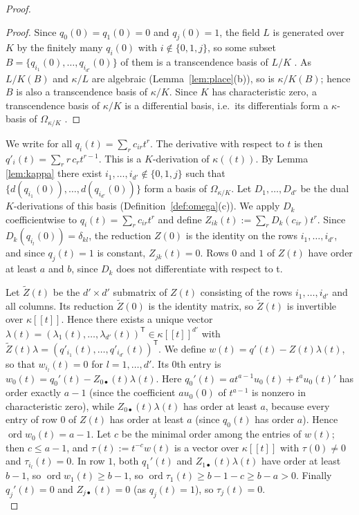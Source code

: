 \documentclass[pdflatex,sn-mathphys-num]{sn-jnl}
\numberwithin{equation}{section}
\theoremstyle{thmstyleone}
\theoremstyle{thmstyletwo}
\begin{document}
\begin{proof}
\begin{proof}
Since $q_0(0)=q_1(0)=0$ and $q_j(0)=1$, the field $L$ is generated over $K$ by
the finitely many $q_i(0)$ with $i\notin\{0,1,j\}$, so some subset
$B=\{q_{i_1}(0),\dots,q_{i_{d'}}(0)\}$ of them is a transcendence basis of $L/K$
\cite[Thm. VIII.1.1]{lang}. As $L/K(B)$ and $\kappa/L$ are algebraic
(Lemma~\ref{lem:place}(b)), so is $\kappa/K(B)$; hence $B$ is also a
transcendence basis of $\kappa/K$. Since $K$ has characteristic zero, a
transcendence basis of $\kappa/K$ is a differential basis, i.e.\ its
differentials form a $\kappa$-basis of $\Omega_{\kappa/K}$
\cite[Thm.~26.5]{matsumura}.
\end{proof}


We write for all $q_i(t) = \sum_rc_{ir}t^r$. The derivative with respect to $t$ is then $q'_i(t) = \sum_rr\,c_rt^{r-1}$. This is a $K$-derivation of $\kappa((t))$. By Lemma \ref{lem:kappa} there exist $i_1,\dots,i_{d'}\notin\{0,1,j\}$ such that $\{d(q_{i_1}(0)),\dots,d(q_{i_{d'}}(0))\}$ form a basis of $\Omega_{\kappa/K}$. Let $D_1,\dots,D_{d'}$ be the dual $K$-derivations of this basis (Definition~\ref{def:omega}(c)). 
We apply $D_k$ coefficientwise to $q_i(t)=\sum_rc_{ir}t^r$ and define $Z_{ik}(t):=\sum_rD_k(c_{ir})t^r$. Since $D_k(q_{i_l}(0))=\delta_{kl}$, the reduction $Z(0)$ is the identity on the rows $i_1,\dots,i_{d'}$, and since $q_j(t) = 1$ is constant, $Z_{jk}(t)=0$. Rows $0$ and $1$ of $Z(t)$ have order at least $a$ and $b$, since $D_k$ does not differentiate with respect to t. 

Let $\tilde Z(t)$ be the ${d'}\times {d'}$ submatrix of $Z(t)$ consisting of the rows
$i_1,\dots,i_{d'}$ and all columns. Its reduction $\tilde Z(0)$ is the identity
matrix, so $\tilde Z(t)$ is invertible over $\kappa[[t]]$. Hence there exists a unique vector
$\lambda(t)=(\lambda_1(t),\dots,\lambda_{d'}(t))^{\mathsf T}\in\kappa[[t]]^{d'}$ with
$\tilde Z(t)\lambda=(q'_{i_1}(t),\dots,q'_{i_{d'}}(t))^{\mathsf T}$. We define $w(t)=q'(t)-Z(t)\lambda(t)$, so
that $w_{i_l}(t)=0$ for $l=1,\dots,{d'}$.
Its $0$th entry is $w_0(t)=q_0'(t)-Z_{0\bullet}(t)\lambda(t)$. Here
$q_0'(t)=at^{a-1}u_0(t)+t^au_0(t)'$ has order exactly $a-1$ (since the coefficient
$au_0(0)$ of $t^{a-1}$ is nonzero in characteristic zero),
while $Z_{0\bullet}(t)\lambda(t)$ has order at least $a$, because every entry of
row $0$ of $Z(t)$ has order at least $a$ (since $q_0(t)$
has order $a$). Hence $\operatorname{ord}w_0(t)=a-1$. Let $c$ be the minimal order
among the entries of $w(t)$; then $c\le a-1$, and $\tau(t):=t^{-c}w(t)$ is a vector
over $\kappa[[t]]$ with $\tau(0)\neq0$ and $\tau_{i_l}(t)=0$. In row $1$, both
$q_1'(t)$ and $Z_{1\bullet}(t)\lambda(t)$ have order at least $b-1$, so $\operatorname{ord}w_1(t)\ge b-1$, so
$\operatorname{ord}\tau_1(t)\ge b-1-c\ge b-a>0$. Finally $q_j'(t)=0$ and
$Z_{j\bullet}(t)=0$ (as $q_j(t)=1$), so $\tau_j(t)=0$. \\



\end{proof}
\end{document}
